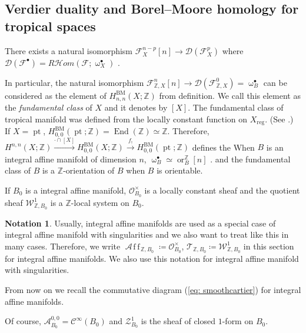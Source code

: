 \documentclass[a4paper,dvipdfmx,reqno,12pt]{amsart}
\theoremstyle{definition}
\newtheorem{Not}[Thm]{Notation}
\newcommand{\deq}{\coloneqq}
\newcommand{\Z}{\mathbb{Z}}%
\newcommand{\mcal}[1]{\mathcal{#1}}%
\newcommand{\opn}[1]{\operatorname{#1}}
\newcommand{\xto}[1]{\xrightarrow{#1}}
\newcommand{\AffS}{{\mathop{\mcal{A}\!f\!\!f\!}\nolimits}}
\numberwithin{equation}{section}
\begin{document}
\subsection{Verdier duality and Borel--Moore homology
for tropical spaces}



There exists a natural isomorphism $\mcal{F}_X^{n-p}[n]\to 
\mcal{D}(\mcal{F}_{X}^{p})$ where 
$\mcal{D}(\mcal{F}^{\bullet})
=R\mcal{H}om(\mcal{F};\upomega_X^{\bullet})$
\cite[Theorem 6.2]{gross2019sheaftheoretic}.

In particular, the natural isomorphism $\mcal{F}_{\Z, X}^{n}[n]\to 
\mcal{D}(\mcal{F}_{\Z, X}^{0})=\upomega_B^{\bullet}$
can be considered as the element of $H_{n,n}^{\opn{BM}}(X;\Z)$ 
from definition. 
We call this element as the \emph{fundamental class} of $X$ 
and it denotes by $[X]$. The fundamental class of tropical
manifold was defined from the locally constant function on 
$X_{\opn{reg}}$. (See \cite[Definition 4.8]{jellLefschetzTheoremTropical2018a}.)
If $X=\opn{pt}$, $H_{0,0}^{\opn{BM}}(\opn{pt};\Z)=\opn{End}(\Z)\simeq \Z$.
Therefore, $H^{n,n}(X;\Z)\xto{\cdot \cap [X]} H_{0,0}^{\opn{BM}}(X;\Z)
\xto{f_!} H_{0,0}^{\opn{BM}}(\opn{pt};\Z)$ defines
the 
When $B$ is an integral affine manifold of dimension $n$, 
$\upomega^{\bullet}_{B}\simeq \opn{or}_{B}^{\Z}[n]$ 
\cite[]{}.
and the fundamental class of $B$ is a $\Z$-orientation of $B$
when $B$ is orientable.



If $B_0$ is a integral affine manifold, 
$\mcal{O}^{\times}_{B_0}$ is a locally constant sheaf and the quotient sheaf $\mcal{W}^{1}_{\Z,B_0}$ is a $\Z$-local system on $B_0$.

\begin{Not}
  Usually, integral affine manifolds are used as a special case of integral affine manifold with singularities and we also want to treat like this in many cases.
  Therefore, we write $\AffS_{\Z,B_0}\deq \mcal{O}^{\times}_{B_0}$, $\mcal{T}_{\Z,B_0}\deq \mcal{W}_{\Z,B_0}^{1}$ in this section for integral affine manifolds. We also use this notation for integral affine manifold with singularities.
\end{Not}

From now on we recall the commutative diagram (\ref{eq: smoothcartier})
 for integral affine manifolds.

Of course, $\mcal{A}_{B_0}^{0,0}=\mcal{C}^{\infty}(B_0)$ and
 $\mcal{Z}^{1}_{B_0}$ is the sheaf of closed $1$-form on $B_0$.
\end{document}
